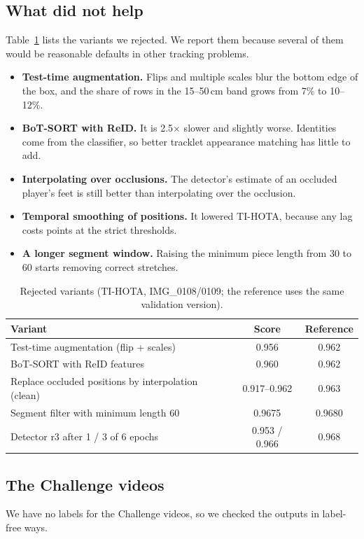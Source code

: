 \documentclass[11pt,a4paper]{article}
\begin{document}
\subsection{What did not help}
\label{sec:neg}
Table~\ref{tab:neg} lists the variants we rejected. We report them because several of them would be
reasonable defaults in other tracking problems.
\begin{itemize}
\item \textbf{Test-time augmentation.} Flips and multiple scales blur the bottom edge of the box, and
the share of rows in the 15--50\,cm band grows from 7\% to 10--12\%.
\item \textbf{BoT-SORT with ReID.} It is 2.5$\times$ slower and slightly worse. Identities come from the
classifier, so better tracklet appearance matching has little to add.
\item \textbf{Interpolating over occlusions.} The detector's estimate of an occluded player's feet is
still better than interpolating over the occlusion.
\item \textbf{Temporal smoothing of positions.} It lowered TI-HOTA, because any lag costs points at the
strict thresholds.
\item \textbf{A longer segment window.} Raising the minimum piece length from 30 to 60 starts removing
correct stretches.
\end{itemize}

\begin{table}[t]
\centering
\caption{Rejected variants (TI-HOTA, IMG\_0108/0109; the reference uses the same validation version).}
\label{tab:neg}
\small
\begin{tabular}{lcc}
\toprule
Variant & Score & Reference \\
\midrule
Test-time augmentation (flip + scales) & 0.956 & 0.962 \\
BoT-SORT with ReID features & 0.960 & 0.962 \\
Replace occluded positions by interpolation (clean) & 0.917--0.962 & 0.963 \\
Segment filter with minimum length 60 & 0.9675 & 0.9680 \\
Detector r3 after 1 / 3 of 6 epochs & 0.953 / 0.966 & 0.968 \\
\bottomrule
\end{tabular}
\end{table}

\subsection{The Challenge videos}
We have no labels for the Challenge videos, so we checked the outputs in label-free ways.
\end{document}
